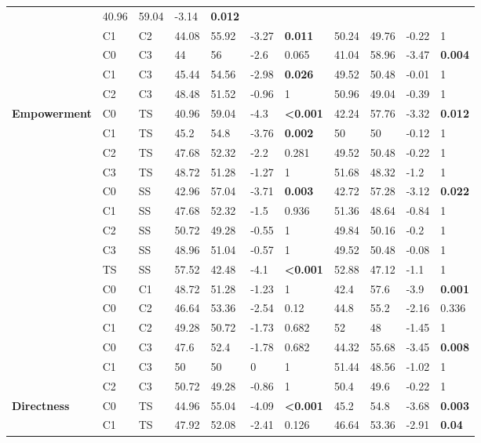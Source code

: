 \documentclass{article}
\begin{document}
\begin{table}[htp]
\begin{tabular}{l l l l l l l l l l l}
& 40.96 & 59.04 & -3.14 & \textbf{0.012}
\\
 & C1 & C2 & 44.08 & 55.92 & -3.27 & \textbf{0.011}
& 50.24 & 49.76 & -0.22 & 1
\\
 & C0 & C3 & 44 & 56 & -2.6 & 0.065
& 41.04 & 58.96 & -3.47 & \textbf{0.004}
\\
 & C1 & C3 & 45.44 & 54.56 & -2.98 & \textbf{0.026}
& 49.52 & 50.48 & -0.01 & 1
\\
 & C2 & C3 & 48.48 & 51.52 & -0.96 & 1
& 50.96 & 49.04 & -0.39 & 1
\\
 \hline
\multirow{15}{*}{\textbf{Empowerment}} & C0 & TS & 40.96 & 59.04 & -4.3 & \textbf{\textless0.001}
& 42.24 & 57.76 & -3.32 & \textbf{0.012}
\\
 & C1 & TS & 45.2 & 54.8 & -3.76 & \textbf{0.002}
& 50 & 50 & -0.12 & 1
\\
 & C2 & TS & 47.68 & 52.32 & -2.2 & 0.281
& 49.52 & 50.48 & -0.22 & 1
\\
 & C3 & TS & 48.72 & 51.28 & -1.27 & 1
& 51.68 & 48.32 & -1.2 & 1
\\
 & C0 & SS & 42.96 & 57.04 & -3.71 & \textbf{0.003}
& 42.72 & 57.28 & -3.12 & \textbf{0.022}
\\
 & C1 & SS & 47.68 & 52.32 & -1.5 & 0.936
& 51.36 & 48.64 & -0.84 & 1
\\
 & C2 & SS & 50.72 & 49.28 & -0.55 & 1
& 49.84 & 50.16 & -0.2 & 1
\\
 & C3 & SS & 48.96 & 51.04 & -0.57 & 1
& 49.52 & 50.48 & -0.08 & 1
\\
 & TS & SS & 57.52 & 42.48 & -4.1 &\textbf{ \textless0.001}
& 52.88 & 47.12 & -1.1 & 1
\\
 & C0 & C1 & 48.72 & 51.28 & -1.23 & 1
& 42.4 & 57.6 & -3.9 & \textbf{0.001}
\\
 & C0 & C2 & 46.64 & 53.36 & -2.54 & 0.12
& 44.8 & 55.2 & -2.16 & 0.336
\\
 & C1 & C2 & 49.28 & 50.72 & -1.73 & 0.682
& 52 & 48 & -1.45 & 1
\\
 & C0 & C3 & 47.6 & 52.4 & -1.78 & 0.682
& 44.32 & 55.68 & -3.45 & \textbf{0.008}
\\
 & C1 & C3 & 50 & 50 & 0 & 1
& 51.44 & 48.56 & -1.02 & 1
\\
 & C2 & C3 & 50.72 & 49.28 & -0.86 & 1
& 50.4 & 49.6 & -0.22 & 1
\\
 \hline
\multirow{15}{*}{\textbf{Directness}} & C0 & TS & 44.96 & 55.04 & -4.09 & \textbf{\textless0.001}
& 45.2 & 54.8 & -3.68 & \textbf{0.003}
\\
 & C1 & TS & 47.92 & 52.08 & -2.41 & 0.126
& 46.64 & 53.36 & -2.91 & \textbf{0.04}

\end{tabular}
\end{table}
\end{document}
